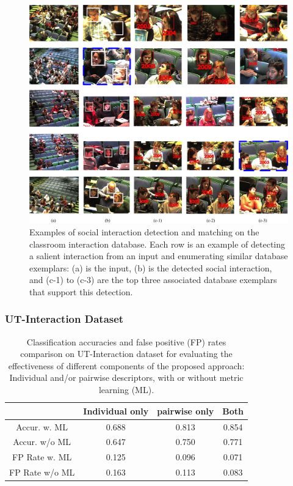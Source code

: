 \begin{figure}
\begin{center}
\includegraphics[scale=2.25]{retrieved.png}
\end{center}
\vspace{-10pt}
\caption{Examples of social interaction detection and matching on the classroom interaction database. Each row is an example of detecting a salient interaction from an input and enumerating similar database exemplars: (a) is the input, (b) is the detected social interaction, and (c-1) to (c-3) are the top three associated database exemplars that support this detection.}
\label{retrieved}
\end{figure}

\subsubsection{UT-Interaction Dataset}


\begin{table}[h]
\centering \caption{Classification accuracies and false positive (FP) rates comparison on UT-Interaction dataset for evaluating the effectiveness of different components of the proposed approach: Individual and/or pairwise descriptors, with or without metric learning (ML).}
\footnotesize{
\begin{tabular}{|c|c|c|c|}
\hline   & Individual only & pairwise only & Both \\
\hline Accur. w. ML & 0.688 & 0.813 & 0.854  \\
\hline Accur. w/o ML & 0.647 & 0.750 & 0.771    \\
\hline FP Rate w. ML &  0.125 & 0.096 & 0.071  \\
\hline FP Rate w/o ML & 0.163 & 0.113 & 0.083\\
\hline 
\end{tabular}
}
\label{UTaccuFPdegrade}
\end{table}


